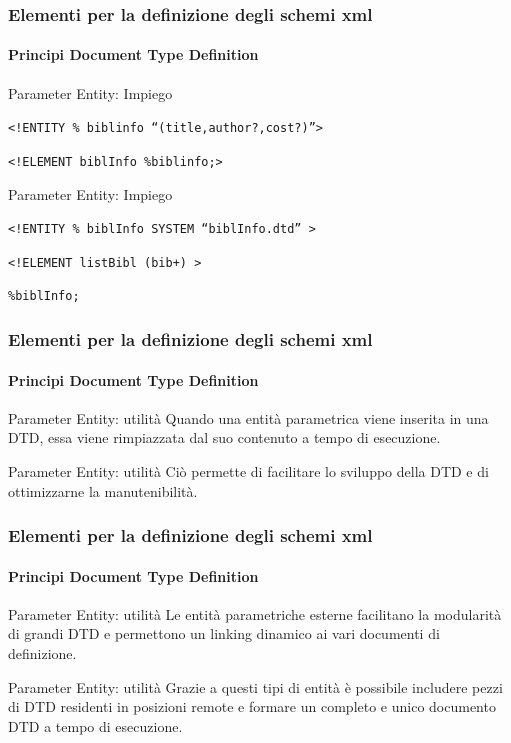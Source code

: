 \begin{frame}
    \frametitle{Elementi per la definizione degli schemi xml}
    \framesubtitle{Principi Document Type Definition}
    \addtocounter{nframe}{1}

    \begin{block}{Parameter Entity: Impiego}
    \begin{center}\texttt{<!ENTITY \% biblinfo ``(title,author?,cost?)''>}\end{center}
    \begin{center}\texttt{<!ELEMENT biblInfo \%biblinfo;>}\end{center}
    \end{block}

    \begin{block}{Parameter Entity: Impiego}
        \begin{center}\texttt{<!ENTITY \% biblInfo SYSTEM ``biblInfo.dtd'' >}\end{center}
        \begin{center}\texttt{<!ELEMENT listBibl (bib+) >}\end{center}
        \begin{center}\texttt{\%biblInfo;}\end{center}
    \end{block}
\end{frame}


\begin{frame}
    \frametitle{Elementi per la definizione degli schemi xml}
    \framesubtitle{Principi Document Type Definition}
    \addtocounter{nframe}{1}

    \begin{block}{Parameter Entity: utilità}
     Quando una entità parametrica viene inserita in una DTD, essa viene rimpiazzata dal suo contenuto a tempo di esecuzione.
    \end{block}

    \begin{block}{Parameter Entity: utilità}
        Ciò permette di facilitare lo sviluppo della DTD e di ottimizzarne la manutenibilità.
    \end{block}
\end{frame}

\begin{frame}
    \frametitle{Elementi per la definizione degli schemi xml}
    \framesubtitle{Principi Document Type Definition}
    \addtocounter{nframe}{1}

    \begin{block}{Parameter Entity: utilità}
       Le entità parametriche esterne facilitano la modularità di grandi DTD e permettono un linking dinamico ai vari documenti di definizione.
    \end{block}

    \begin{block}{Parameter Entity: utilità}
        Grazie a questi tipi di entità è possibile includere pezzi di DTD residenti in posizioni remote e formare un completo e unico documento DTD a tempo di esecuzione.
    \end{block}
\end{frame}


